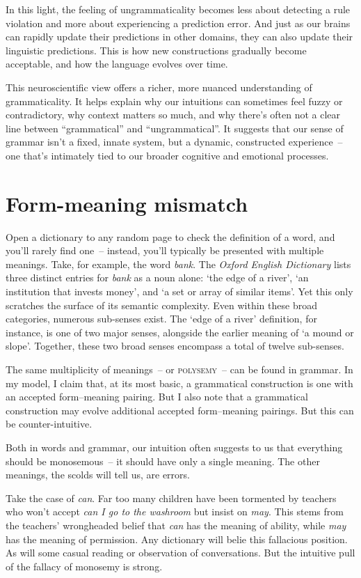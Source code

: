 In this light, the feeling of ungrammaticality becomes less about detecting a rule violation and more about experiencing a prediction error. And just as our brains can rapidly update their predictions in other domains, they can also update their linguistic predictions. This is how new constructions gradually become acceptable, and how the language evolves over time.

This neuroscientific view offers a richer, more nuanced understanding of grammaticality. It helps explain why our intuitions can sometimes feel fuzzy or contradictory, why context matters so much, and why there's often not a clear line between ``grammatical'' and ``ungrammatical''. It suggests that our sense of grammar isn't a fixed, innate system, but a dynamic, constructed experience~-- one that's intimately tied to our broader cognitive and emotional processes.

\section{Form-meaning mismatch}

Open a dictionary to any random page to check the definition of a word, and you'll rarely find one~-- instead, you'll typically be presented with multiple meanings. Take, for example, the word \textit{bank}. The \textit{Oxford English Dictionary} lists three distinct entries for \textit{bank} as a noun alone: `the edge of a river', `an institution that invests money', and `a set or array of similar items'. Yet this only scratches the surface of its semantic complexity. Even within these broad categories, numerous sub-senses exist. The `edge of a river' definition, for instance, is one of two major senses, alongside the earlier meaning of `a mound or slope'. Together, these two broad senses encompass a total of twelve sub-senses.

The same multiplicity of meanings~-- or \textsc{polysemy}~-- can be found in grammar. In my model, I claim that, at its most basic, a grammatical construction is one with an accepted form--meaning pairing. But I also note that a grammatical construction may evolve additional accepted form--meaning pairings. But this can be counter-intuitive.

Both in words and grammar, our intuition often suggests to us that everything should be monosemous~-- it should have only a single meaning. The other meanings, the scolds will tell us, are errors.

Take the case of \textit{can}. Far too many children have been tormented by teachers who won't accept \textit{can I go to the washroom} but insist on \textit{may}. This stems from the teachers' wrongheaded belief that \textit{can} has the meaning of ability, while \textit{may} has the meaning of permission. Any dictionary will belie this fallacious position. As will some casual reading or observation of conversations. But the intuitive pull of the fallacy of monosemy is strong.


